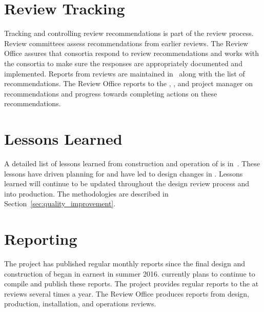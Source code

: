\section{Review Tracking}

Tracking and controlling review recommendations is part of the review
process. Review committees assess recommendations from earlier
reviews. The Review Office assures that consortia respond to review
recommendations and works with the consortia to make sure the
responses are appropriately documented and implemented. Reports from
 reviews are maintained in~ along with the
list of recommendations. The Review Office reports to the ,
, and  project manager on recommendations
and progress towards completing actions on these recommendations.


\section{Lessons Learned}
\label{sec:fdsp-coord-lessons}

A detailed list of lessons learned from construction and operation of
 is in~. These lessons have driven planning for
 and have led to design changes in . Lessons
learned will continue to be updated throughout the design review process
and into production. The methodologies are described in
Section~\ref{sec:quality_improvement}. %


\section{Reporting}
\label{sec:fdsp-coord-reporting}

The  project has published regular monthly reports since
the final design and construction of  began in
earnest in summer 2016.  currently plans to continue to compile and
publish these reports. The  project provides
regular reports to the  at reviews several times a
year. The  Review Office produces reports from design,
production, installation, and operations reviews.
